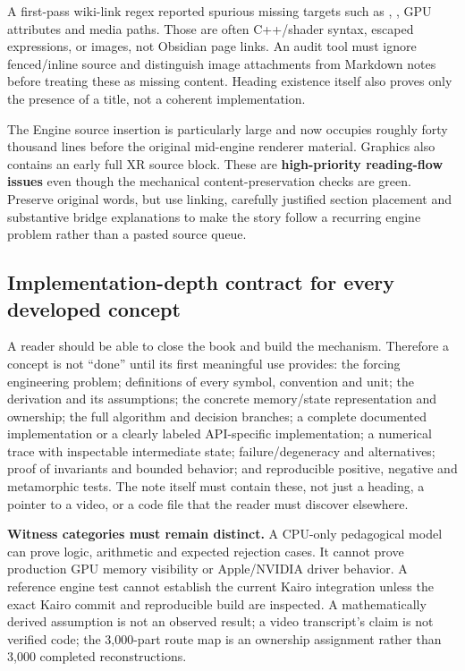 A first-pass wiki-link regex reported spurious missing targets such as , , GPU attributes and media paths. Those are often C++/shader syntax, escaped expressions, or images, not Obsidian page links. An audit tool must ignore fenced/inline source and distinguish image attachments from Markdown notes before treating these as missing content. Heading existence itself also proves only the presence of a title, not a coherent implementation.

The Engine source insertion is particularly large and now occupies roughly forty thousand lines before the original mid-engine renderer material. Graphics also contains an early full XR source block. These are \textbf{high-priority reading-flow issues} even though the mechanical content-preservation checks are green. Preserve original words, but use linking, carefully justified section placement and substantive bridge explanations to make the story follow a recurring engine problem rather than a pasted source queue.

\subsection{Implementation-depth contract for every developed concept}\label{appendix-28e6f216fdc7-implementation-depth-contract-for-every-developed-concept}

\hypertarget{appendix-28e6f216fdc7-implementation-depth-contract-for-every-developed-concept}{}

A reader should be able to close the book and build the mechanism. Therefore a concept is not ``done'' until its first meaningful use provides: the forcing engineering problem; definitions of every symbol, convention and unit; the derivation and its assumptions; the concrete memory/state representation and ownership; the full algorithm and decision branches; a complete documented implementation or a clearly labeled API-specific implementation; a numerical trace with inspectable intermediate state; failure/degeneracy and alternatives; proof of invariants and bounded behavior; and reproducible positive, negative and metamorphic tests. The note itself must contain these, not just a heading, a pointer to a video, or a code file that the reader must discover elsewhere.

\textbf{Witness categories must remain distinct.} A CPU-only pedagogical model can prove logic, arithmetic and expected rejection cases. It cannot prove production GPU memory visibility or Apple/NVIDIA driver behavior. A reference engine test cannot establish the current Kairo integration unless the exact Kairo commit and reproducible build are inspected. A mathematically derived assumption is not an observed result; a video transcript's claim is not verified code; the 3,000-part route map is an ownership assignment rather than 3,000 completed reconstructions.

